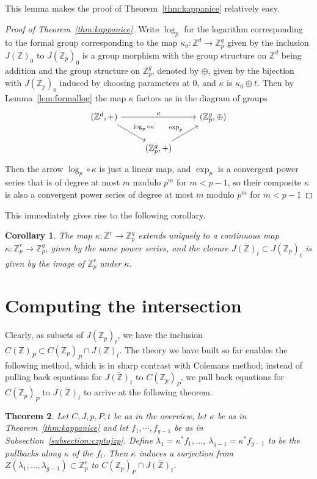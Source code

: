 \documentclass[12pt]{article}
\newcommand{\Z}{\mathbb{Z}}
\theoremstyle{plain}
\newtheorem{thm}{Theorem}[section] %
\newtheorem{cor}[thm]{Corollary} %
\theoremstyle{definition}
\theoremstyle{remark}
\begin{document}
This lemma makes the proof of Theorem~\ref{thm:kappanice} relatively easy. 
\begin{proof}[Proof of Theorem~\ref{thm:kappanice}]
Write $\log_p$ for the logarithm corresponding to the formal group corresponding to the map $\kappa_0: \Z^d \to \Z_p^g$ given by the inclusion $J(\Z)_0$ to $J(\Z_p)_0$ is a group morphism with the group structure on $\Z^d$ being addition and the group structure on $\Z_p^g$, denoted by $\oplus$, given by the bijection with $J(\Z_p)_0$ induced by choosing parameters at $0$, and $\kappa$ is $\kappa_0 \oplus t$. Then by Lemma~\ref{lem:formallog} the map $\kappa$ factors as in the diagram of groups
\[
\begin{tikzcd}
{(\Z^d,+)} \arrow[rr, "\kappa"] \arrow[rd, "\log_p \circ \kappa"] &                                   & {(\Z_p^g,\oplus)} \\
                                                                  & {(\Z_p^g,+)} \arrow[ru, "\exp_p"] &                  
\end{tikzcd}
\]
Then the arrow $\log_p \circ \kappa$ is just a linear map, and $\exp_p$ is a convergent power series that is of degree at most $m$ modulo $p^m$ for $m < p-1$, so their composite $\kappa$ is also a convergent power series of degree at most $m$ modulo $p^m$ for $m < p-1$
\end{proof}

This immediately gives rise to the following corollary.
\begin{cor}
\label{cor:closurejac}
The map $\kappa: \Z^r \to \Z_p^g$ extends uniquely to a continuous map $\kappa: \Z_p^r \to \Z_p^g$, given by the same power series, and the closure $\overline{J(\Z)_t} \subset J(\Z_p)_t$ is given by the image of $\Z_p^r$ under $\kappa$.
\end{cor}

\section{Computing the intersection}
\label{section:intersection}
Clearly, as subsets of $J(\Z_p)_t$, we have the inclusion $C(\Z)_P \subset C(\Z_p)_P \cap \overline{J(\Z)_t}$. The theory we have built so far enables the following method, which is in sharp contrast with Colemans method; instead of pulling back equations for $\overline{J(\Z)_t}$ to $C(\Z_p)_P$, we pull back equations for $C(\Z_p)_P$ to $\overline{J(\Z)_t}$ to arrive at the following theorem.
\begin{thm}
\label{thm:final}
Let $C,J,p,P,t$ be as in the overview, let $\kappa$ be as in Theorem~\ref{thm:kappanice} and let $f_1,\cdots,f_{g-1}$ be as in Subsection~\ref{subsection:czptojzp}. Define $\lambda_1 = \kappa^*f_1,\dots$, $\lambda_{g-1} = \kappa^*f_{g-1}$ to be the pullbacks along $\kappa$ of the $f_i$. Then $\kappa$ induces a surjection from $Z(\lambda_1,\dots,\lambda_{g-1}) \subset \Z_p^r$ to $C(\Z_p)_P \cap \overline{J(\Z)_t}$.
\end{thm}
\end{document}
